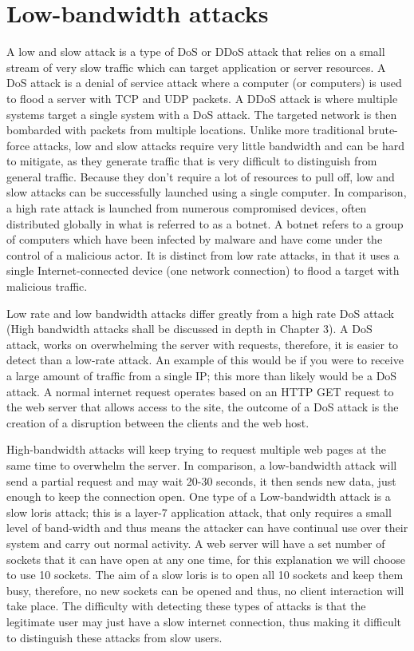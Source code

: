 
\section{Low-bandwidth attacks} \label{attack1}

A low and slow attack is a type of DoS or DDoS attack that relies on a small stream of very slow traffic which can target application or server resources. A DoS attack is a denial of service attack where a computer (or computers) is used to flood a server with TCP and UDP packets. A DDoS attack is where multiple systems target a single system with a DoS attack. The targeted network is then bombarded with packets from multiple locations. Unlike more traditional brute-force attacks, low and slow attacks require very little bandwidth and can be hard to mitigate, as they generate traffic that is very difficult to distinguish from general traffic. Because they don’t require a lot of resources to pull off, low and slow attacks can be successfully launched using a single computer. In comparison, a high rate attack is launched from numerous compromised devices, often distributed globally in what is referred to as a botnet. A botnet refers to a group of computers which have been infected by malware and have come under the control of a malicious actor. It is distinct from low rate attacks, in that it uses a single Internet-connected device (one network connection) to flood a target with malicious traffic. 


Low rate and low bandwidth attacks differ greatly from a high rate DoS attack (High bandwidth attacks shall be discussed in depth in Chapter 3). A DoS attack, works on overwhelming the server with requests, therefore, it is easier to detect than a low-rate attack. An example of this would be if you were to receive a large amount of traffic from a single IP; this more than likely would be a DoS attack. A normal internet request operates based on an HTTP GET request to the web server that allows access to the site, the outcome of a DoS attack is the creation of a disruption between the clients and the web host. 

High-bandwidth attacks will keep trying to request multiple web pages at the same time to overwhelm the server. In comparison, a low-bandwidth attack  will send a partial request and may wait 20-30 seconds, it then sends new data, just enough to keep the connection open. One type of a Low-bandwidth attack is a slow loris attack; this is a layer-7 application attack, that only requires a small level of band-width and thus means the attacker can have continual use over their system and carry out normal activity. A web server will have a set number of sockets that it can have open at any one time, for this explanation we will choose to use 10 sockets. The aim of a slow loris is to open all 10 sockets and keep them busy, therefore, no new sockets can be opened and thus, no client interaction will take place. The difficulty with detecting these types of attacks is that the legitimate user may just have a slow internet connection, thus making it difficult to distinguish these attacks from slow users. 
